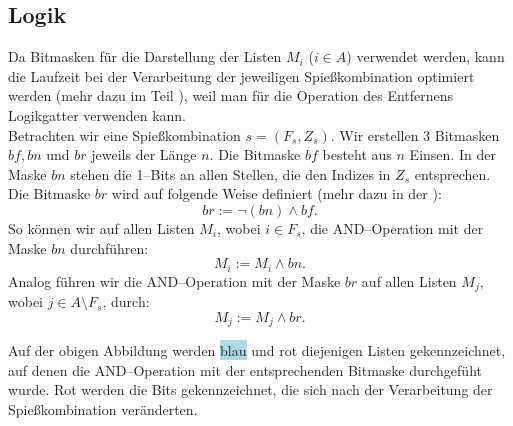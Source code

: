 \subsection{Logik}\label{sec:logik}
Da Bitmasken für die Darstellung der Listen $M_i$ ($i \in A$) verwendet werden, kann
die Laufzeit bei der Verarbeitung der jeweiligen Spießkombination optimiert werden
(mehr dazu im Teil ),
weil man für die Operation des Entfernens Logikgatter verwenden kann.\\

Betrachten wir eine Spießkombination $s = (F_s, Z_s)$.
Wir erstellen 3 Bitmasken $bf, bn$ und $br$ jeweils der Länge $n$.
Die Bitmaske $bf$ besteht aus $n$ Einsen.
In der Maske $bn$ stehen die 1--Bits an allen Stellen, die den Indizes in $Z_s$ entsprechen.
Die Bitmaske $br$ wird auf folgende Weise definiert (mehr dazu in der ):
\[
br := \neg(bn) \land bf.
\]
\noindent So können wir auf allen Listen $M_i$, wobei $i \in F_s$, die AND--Operation mit der Maske $bn$ 
durchführen:
\[
M_i := M_i \land bn.
\]
Analog führen wir die AND--Operation mit der Maske $br$ auf allen Listen $M_j$,
wobei $j \in A \setminus F_s$, durch:
\[
M_j := M_j \land br.
\]



Auf der obigen Abbildung werden \colorbox{lightblue}{blau} und \colorbox{lightred}{rot} diejenigen
Listen gekennzeichnet, auf denen die AND--Operation mit der entsprechenden Bitmaske durchgefüht wurde.
{\color{red} Rot} werden die Bits gekennzeichnet, die sich nach der Verarbeitung der Spießkombination veränderten.\\

